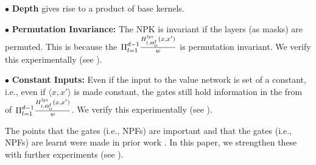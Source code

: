 $\bullet$ \textbf{Depth} gives rise to a product of base kernels. 

$\bullet$ \textbf{Permutation Invariance:} The NPK is invariant if the layers (as masks) are permuted. This is because the $\Pi_{l=1}^{d-1} \frac{H^{\text{lyr}}_{l,\Theta^{\textrm{f}}_0}(x,x')}{w}$ is permutation invariant. We verify this experimentally (see ).

$\bullet$ \textbf{Constant Inputs:} Even if the input to the value network is set of a constant, i.e., even if $\langle x,x'\rangle$ is made constant, the gates still hold information in the from of $\Pi_{l=1}^{d-1} \frac{H^{\text{lyr}}_{l,\Theta^{\textrm{f}}_0}(x,x')}{w}$. We verify this experimentally (see ).

The points that the gates (i.e., NPFs) are important and that the gates (i.e., NPFs) are learnt were made in prior work \cite{npk}. In this paper, we strengthen these with further experiments (see ).

